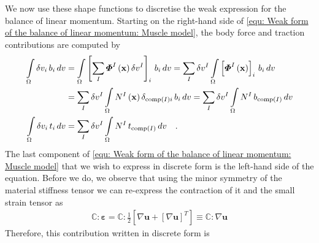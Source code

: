 \documentclass[]{scrartcl}
\begin{document}
We now use these shape functions to discretise the weak expression for the balance of linear momentum.
Starting on the right-hand side of \cref{equ: Weak form of the balance of linear momentum: Muscle model}, the body force and traction contributions are computed by
\begin{align}
\int\limits_{\Omega} \delta v_{i} \, b_{i} \, dv
  &= \int\limits_{\Omega} \left[ \sum\limits_{I} \boldsymbol{\varPhi}^{I} \left( \mathbf{x} \right) \delta v^{I} \right]_{i} \, b_{i} \, dv
   = \sum\limits_{I} \delta v^{I} \int\limits_{\Omega} \left[  \boldsymbol{\varPhi}^{I} \left( \mathbf{x} \right) \right]_{i} \, b_{i} \, dv \notag\\
  &= \sum\limits_{I} \delta v^{I} \int\limits_{\Omega} N^{I} \left( \mathbf{x} \right) \delta_{\textnormal{comp}(I) i} \, b_{i} \, dv
   = \sum\limits_{I} \delta v^{I} \int\limits_{\Omega} N^{I} \, b_{\textnormal{comp}(I)} \, dv 
\label{equ: Discretisation: Body force}
\\
\int\limits_{\Omega} \delta v_{i} \, t_{i} \, dv
  &= \sum\limits_{I} \delta v^{I} \int\limits_{\Omega} N^{I} \, t_{\textnormal{comp}(I)} \, dv 
\label{equ: Discretisation: Traction}
\quad .
\end{align}
The last component of \cref{equ: Weak form of the balance of linear momentum: Muscle model} that we wish to express in discrete form is the left-hand side of the equation.
Before we do, we observe that using the minor symmetry of the material stiffness tensor we can re-express the contraction of it and the small strain tensor as
\begin{gather}
\boldsymbol{\mathbb{C}} : \boldsymbol{\varepsilon}
  = \boldsymbol{\mathbb{C}} : \frac{1}{2} \left[ \nabla \mathbf{u} + \left[ \nabla \mathbf{u} \right]^{T} \right]
  \equiv \boldsymbol{\mathbb{C}} : \nabla \mathbf{u}
\end{gather}
Therefore, this contribution written in discrete form is
\end{document}
